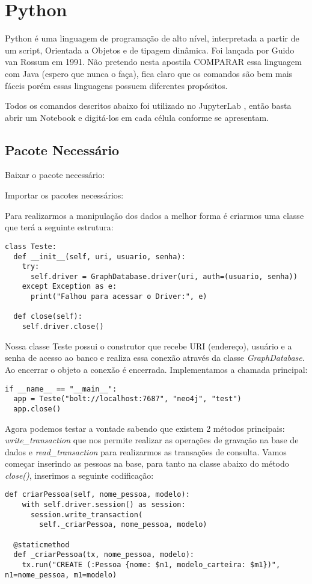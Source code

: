 \section{Python}
Python é uma linguagem de programação de alto nível, interpretada a partir de um script, Orientada a Objetos e de tipagem dinâmica. Foi lançada por Guido van Rossum em 1991. Não pretendo nesta apostila COMPARAR essa linguagem com Java (espero que nunca o faça), fica claro que os comandos são bem mais fáceis porém essas linguagens possuem diferentes propósitos.

Todos os comandos descritos abaixo foi utilizado no JupyterLab \cite{jupyteroficial}, então basta abrir um Notebook e digitá-los em cada célula conforme se apresentam.

\subsection{Pacote Necessário}
Baixar o pacote necessário: \\

Importar os pacotes necessários: \\

Para realizarmos a manipulação dos dados a melhor forma é criarmos uma classe que terá a seguinte estrutura:
\begin{lstlisting}[]
class Teste:
  def __init__(self, uri, usuario, senha):
    try:
      self.driver = GraphDatabase.driver(uri, auth=(usuario, senha))
    except Exception as e:
      print("Falhou para acessar o Driver:", e)

  def close(self):
    self.driver.close()
\end{lstlisting}	

Nossa classe Teste possui o construtor que recebe URI (endereço), usuário e a senha de acesso ao banco e realiza essa conexão através da classe \textit{GraphDatabase}. Ao encerrar o objeto a conexão é encerrada.
Implementamos a chamada principal:
\begin{lstlisting}[]
if __name__ == "__main__":
  app = Teste("bolt://localhost:7687", "neo4j", "test")
  app.close()
\end{lstlisting}

Agora podemos testar a vontade sabendo que existem 2 métodos principais: \textit{write\_transaction} que nos permite realizar as operações de gravação na base de dados e \textit{read\_transaction} para realizarmos as transações de consulta. Vamos começar inserindo as pessoas na base, para tanto na classe abaixo do método \textit{close()}, inserimos a seguinte codificação:
\begin{lstlisting}[]
  def criarPessoa(self, nome_pessoa, modelo):
    with self.driver.session() as session:
      session.write_transaction(
        self._criarPessoa, nome_pessoa, modelo)

  @staticmethod
  def _criarPessoa(tx, nome_pessoa, modelo):
    tx.run("CREATE (:Pessoa {nome: $n1, modelo_carteira: $m1})", n1=nome_pessoa, m1=modelo)	
\end{lstlisting}	


